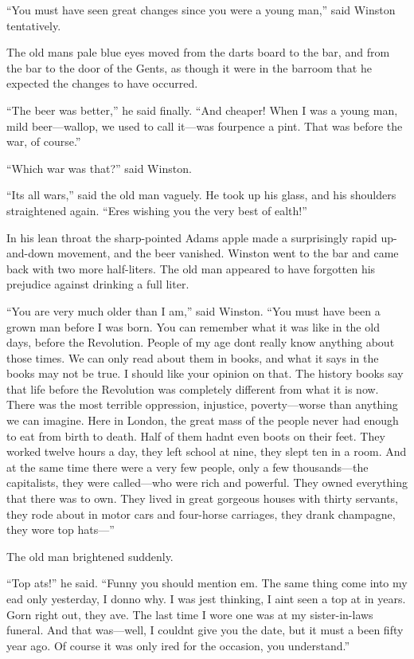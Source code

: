 ``You must have seen great changes since you were a young man,'' said
Winston tentatively.

The old man\textquotesingle s pale blue eyes moved from the darts board
to the bar, and from the bar to the door of the Gents, as though it were
in the barroom that he expected the changes to have occurred.

``The beer was better,'' he said finally. ``And cheaper! When I was a young
man, mild beer---wallop, we used to call it---was fourpence a pint. That
was before the war, of course.''

``Which war was that?'' said Winston.

``It\textquotesingle s all wars,'' said the old man vaguely. He took up
his glass, and his shoulders straightened again.
``\textquotesingle Ere\textquotesingle s wishing you the very best of
\textquotesingle ealth!''

In his lean throat the sharp-pointed Adam\textquotesingle s apple made a
surprisingly rapid up-and-down movement, and the beer vanished. Winston
went to the bar and came back with two more half-liters. The old man
appeared to have forgotten his prejudice against drinking a full liter.

``You are very much older than I am,'' said Winston. ``You must have been a
grown man before I was born. You can remember what it was like in the
old days, before the Revolution. People of my age don\textquotesingle t
really know anything about those times. We can only read about them in
books, and what it says in the books may not be true. I should like your
opinion on that. The history books say that life before the Revolution
was completely different from what it is now. There was the most
terrible oppression, injustice, poverty---worse than anything we can
imagine. Here in London, the great mass of the people never had enough
to eat from birth to death. Half of them hadn\textquotesingle t even
boots on their feet. They worked twelve hours a day, they left school at
nine, they slept ten in a room. And at the same time there were a very
few people, only a few thousands---the capitalists, they were
called---who were rich and powerful. They owned everything that there
was to own. They lived in great gorgeous houses with thirty servants,
they rode about in motor cars and four-horse carriages, they drank
champagne, they wore top hats---''

The old man brightened suddenly.

``Top \textquotesingle ats!'' he said. ``Funny you should mention
\textquotesingle em. The same thing come into my \textquotesingle ead
only yesterday, I donno why. I was jest thinking, I
ain\textquotesingle t seen a top \textquotesingle at in years. Gorn
right out, they \textquotesingle ave. The last time I wore one was at my
sister-in-law\textquotesingle s funeral. And that was---well, I
couldn\textquotesingle t give you the date, but it must
\textquotesingle a been fifty year ago. Of course it was only
\textquotesingle ired for the occasion, you understand.''

